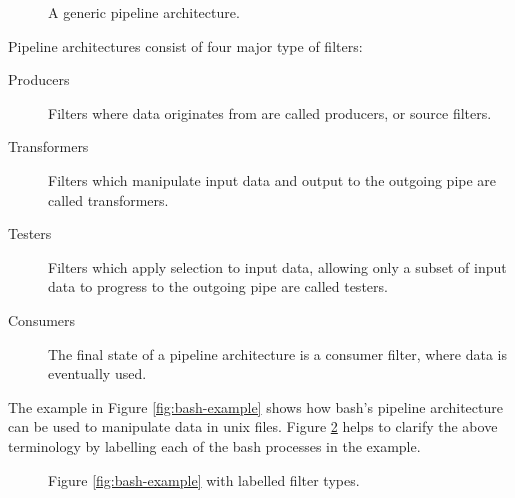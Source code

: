\begin{figure}[ht]
    \centering
{}
\caption{A generic pipeline architecture.}
\label{fig:pipe-filter}
\end{figure}

\noindent Pipeline architectures consist of four major type of filters:

\begin{description}
    \item[Producers] Filters where data originates from are called producers, or source filters.
    \item[Transformers] Filters which manipulate input data and output to the outgoing pipe are called transformers.
    \item[Testers] Filters which apply selection to input data, allowing only a subset of input data to progress to the outgoing pipe are called testers.
    \item[Consumers] The final state of a pipeline architecture is a consumer filter, where data is eventually used.
\end{description}

The example in Figure \ref{fig:bash-example} shows how bash's pipeline architecture can be used to manipulate data in unix files.
Figure \ref{fig:bash-example-labelled} helps to clarify the above terminology by labelling each of the bash processes in the example.

\begin{figure}[H]
    \centering
{}
\caption{Figure \ref{fig:bash-example} with labelled filter types.}
\label{fig:bash-example-labelled}
\end{figure}

